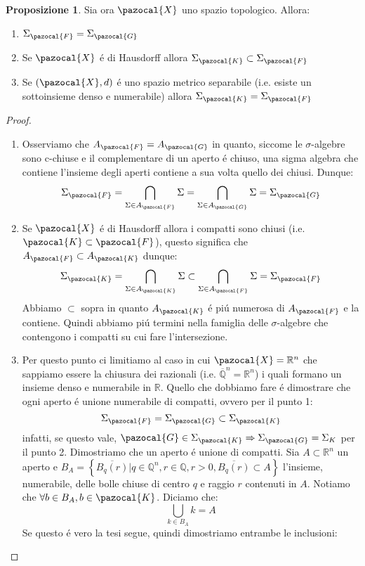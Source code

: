 \documentclass[11pt,a4paper]{report}
\theoremstyle{plain}
\theoremstyle{definition}
\newtheorem{prop}[thm]{Proposizione} %
\newcommand{\X}{\pazocal{X}}
\newcommand{\K}{\pazocal{K}}
\newcommand{\F}{\pazocal{F}}
\newcommand{\G}{\pazocal{G}}
\begin{document}
\begin{prop}
	Sia ora $\X$ uno spazio topologico. Allora:
	\begin{enumerate}
		\item $\Sigma_\F = \Sigma_\G$
		\item Se $\X$ \'e di Hausdorff allora $\Sigma_\K \subset \Sigma_\F$
		\item Se $(\X,d)$ \'e uno spazio metrico separabile (i.e. esiste un sottoinsieme denso e numerabile) allora $\Sigma_\K = \Sigma_\F$
		\end{enumerate}
		\begin{proof}
			\begin{enumerate}
				\item Osserviamo che $A_\F = A_\G$ in quanto, siccome le $\sigma$-algebre sono c-chiuse e il complementare di un aperto \'e chiuso, una sigma algebra che contiene l'insieme degli aperti contiene a sua volta quello dei chiusi. Dunque:
				\[
					\Sigma_\F = \bigcap\limits_{\Sigma \in A_\F} \Sigma = \bigcap\limits_{\Sigma \in A_\G} \Sigma = \Sigma_\G
				\]
				\item Se $\X$ \'e di Hausdorff allora i compatti sono chiusi (i.e. $\K \subset \F$), questo significa che $A_\F \subset A_\K$ dunque:
				\[
					\Sigma_\K = \bigcap\limits_{\Sigma \in A_\K} \Sigma \subset \bigcap\limits_{\Sigma \in A_\F} \Sigma = \Sigma_\F
				\]
				Abbiamo $\subset$ sopra in quanto $A_\K$ \'e pi\'u numerosa di $A_\F$ e la contiene. Quindi abbiamo pi\'u termini nella famiglia delle $\sigma$-algebre che contengono i compatti su cui fare l'intersezione.
				\item Per questo punto ci limitiamo al caso in cui $\X = \mathbb{R}^n$ che sappiamo essere la chiusura dei razionali (i.e. $\overline{\mathbb{Q}}^n = \mathbb{R}^n$) i quali formano un insieme denso e numerabile in $\mathbb{R}$. Quello che dobbiamo fare \'e dimostrare che ogni aperto \'e unione numerabile di compatti, ovvero per il punto 1:
				\[
					\Sigma_\F = \Sigma_\G \subset \Sigma_\K
				\]
				infatti, se questo vale, $\G \in \Sigma_\K \Rightarrow \Sigma_\G = \Sigma_K$ per il punto 2.
				Dimostriamo che un aperto \'e unione di compatti. Sia $A \subset \mathbb{R}^n$ un aperto e $B_A = \left\{\overline{B_q(r)}| q \in \mathbb{Q}^n, r \in \mathbb{Q}, r > 0, \overline{B_q(r)} \subset A\right\}$ l'insieme, numerabile, delle bolle chiuse di centro $q$ e raggio $r$ contenuti in $A$. Notiamo che $\forall b \in B_A, b \in \K$. Diciamo che:
				\[
					\bigcup\limits_{k \in B_A}k = A				
				\]
				Se questo \'e vero la tesi segue, quindi dimostriamo entrambe le inclusioni:

\end{enumerate}
\end{proof}
\end{prop}
\end{document}
